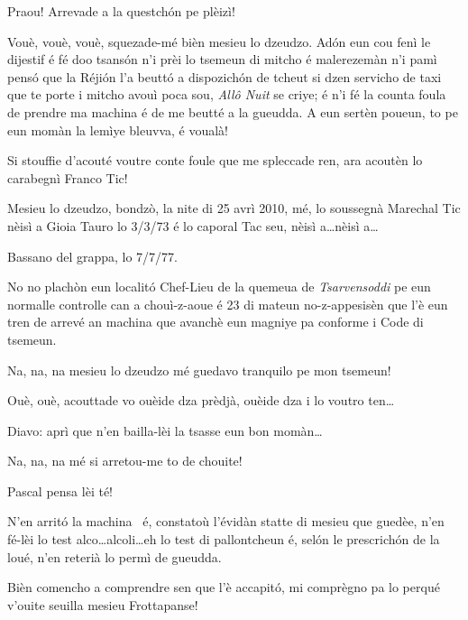 \begin{drama}
\DzeudzoSenliquerspeaks Praou! Arrevade a la questchón pe plèizì!

\Cienspeaks Vouè, vouè, vouè, squezade-mé bièn mesieu lo dzeudzo. Adón eun cou fenì le dijestif é fé doo tsansón n’i prèi lo tsemeun di mitcho é malerezemàn n’i pamì pensó que la Réjión l’a beuttó a dispozichón de tcheut si dzen servicho de taxi que te porte i mitcho avouì poca sou, \textit{Allô Nuit} se criye; é n’i fé la counta foula de prendre ma machina é de me beutté a la gueudda. A eun sertèn poueun, to pe eun momàn la lemìye bleuvva, é voualà!

\DzeudzoSenliquerspeaks  Si stouffie d'acouté voutre conte foule que me spleccade ren, ara acoutèn lo carabegnì Franco Tic!


\Ticspeaks Mesieu lo dzeudzo, bondzò, la nite di 25 avrì 2010, mé, lo soussegnà Marechal Tic nèisì a Gioia Tauro lo 3/3/73 é lo caporal Tac seu, nèisì a\ldots nèisì a\ldots

\Tacspeaks Bassano del grappa,  lo 7/7/77.

\Ticspeaks  No no plachòn eun localitó Chef-Lieu de la quemeua de \textit{Tsarvensoddi} pe eun normalle controlle can a chouì-z-aoue é 23 di mateun no-z-appesisèn que l’è eun tren de arrevé an machina que avanchè eun magniye pa conforme i Code di tsemeun. 

\Cienspeaks Na, na, na mesieu lo dzeudzo mé guedavo tranquilo pe mon tsemeun!

\DzeudzoSenliquerspeaks {}  Ouè, ouè, acouttade vo ouèide dza prèdjà, ouèide dza i lo voutro ten\ldots

\Ticspeaks Diavo: aprì que n’en bailla-lèi la tsasse eun bon momàn\ldots

\Cienspeaks Na, na, na mé si arretou-me to de chouite!

\DzeudzoSenliquerspeaks {}  Pascal pensa lèi té!


\Ticspeaks N’en arritó la machina \machina\ é, constatoù l’évidàn statte di mesieu que guedèe, n’en fé-lèi lo test alco\ldots alcoli\ldots eh lo test di pallontcheun é, selón le prescrichón de la loué, n’en reterià lo permì de gueudda.

\DzeudzoSenliquerspeaks Bièn comencho a comprendre sen que l'è accapitó, mi comprègno pa lo perqué v'ouite seuilla mesieu Frottapanse!


\end{drama}
